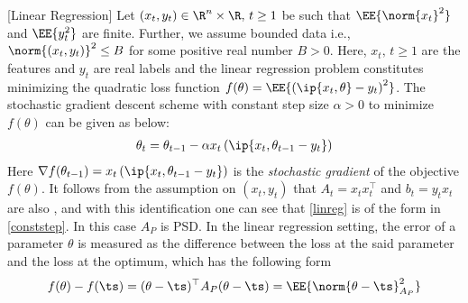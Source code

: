 \begin{comment}
We consider the vanilla version of the linear regression problem, where `amazing' results are known. It serves us to contrast the results we obtain for general linear stochastic approximation algorithms to the results known for this setting.
\end{comment}
\begin{example}\label{ex:leastsquares}[Linear Regression]
Let $(x_t,y_t)\in \R^n\times \R,\,t\geq 1$ be \iid such that $\EE{\norm{x_t}^2}$ and $\EE{y_t^2}$ are finite. Further, we assume bounded data i.e., $\norm{(x_t,y_t)}^2\leq B$ for some positive real number $B>0$. Here, $x_t,\,t\geq 1$ are the features and $y_t$ are real labels and the linear regression problem constitutes minimizing the quadratic loss function $f(\theta)=\EE{\left(\ip{x_t,\theta}-y_t\right)^2}$. The stochastic gradient descent scheme with constant step size $\alpha>0$ to minimize $f(\theta)$ can be given as below:
\begin{align}\label{linreg}
\theta_t=\theta_{t-1}-\alpha x_t\left(\ip{x_t,\theta_{t-1} -y_t}\right)
\end{align}
Here $\nabla f(\theta_{t-1})=x_t\left(\ip{x_t,\theta_{t-1} -y_t}\right)$ is the \emph{stochastic gradient} of the objective $f(\theta)$. It follows from the \iid assumption on $(x_t,y_t)$ that $A_t=x_t x_t^\top$ and $b_t=y_t x_t$ are also \iid, and with this identification one can see that \eqref{linreg} is of the form in \eqref{conststep}. In this case $A_P$ is PSD.
In the linear regression setting, the error of a parameter $\theta$ is measured as the difference between the loss at the said parameter and the loss at the optimum, which has the following form
\begin{align*}
f(\theta)-f(\ts)=(\theta-\ts)^\top A_P (\theta-\ts)=\EE{\norm{\theta-\ts}^2_{A_P}}
\end{align*}
\end{example}
